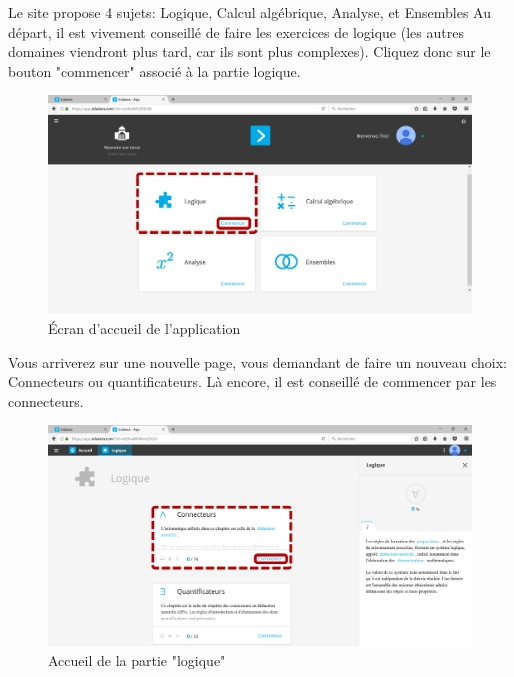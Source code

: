 \documentclass[a4paper]{article}
\begin{document}
Le site propose 4 sujets: Logique, Calcul algébrique, Analyse, et Ensembles
Au départ, il est vivement conseillé de faire les exercices de logique (les autres domaines viendront plus tard, car ils sont plus complexes).
Cliquez donc sur le bouton "commencer" associé à la partie logique.
\begin{figure}[h!]
\begin{center}
\includegraphics[scale=0.1]{img_app2.png}
\end{center}
\caption{Écran d'accueil de l'application}\label{im:accueil}
\end{figure}
\FloatBarrier

Vous arriverez sur une nouvelle page, vous demandant de faire un nouveau choix: Connecteurs ou quantificateurs.
Là encore, il est conseillé de commencer par les connecteurs.
\begin{figure}[h!]
\begin{center}
\includegraphics[scale=0.1]{img_app3.png}
\end{center}
\caption{Accueil de la partie "logique"}\label{im:logique_accueil}
\end{figure}
\FloatBarrier
\end{document}
